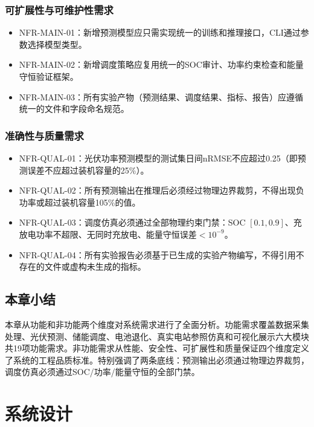 \documentclass[12pt,a4paper]{ctexbook}
\begin{document}
\subsection{可扩展性与可维护性需求}

\begin{itemize}
  \item NFR-MAIN-01：新增预测模型应只需实现统一的训练和推理接口，CLI通过参数选择模型类型。
  \item NFR-MAIN-02：新增调度策略应复用统一的SOC审计、功率约束检查和能量守恒验证框架。
  \item NFR-MAIN-03：所有实验产物（预测结果、调度结果、指标、报告）应遵循统一的文件和字段命名规范。
\end{itemize}

\subsection{准确性与质量需求}

\begin{itemize}
  \item NFR-QUAL-01：光伏功率预测模型的测试集日间nRMSE不应超过0.25（即预测误差不应超过装机容量的25\%）。
  \item NFR-QUAL-02：所有预测输出在推理后必须经过物理边界裁剪，不得出现负功率或超过装机容量105\%的值。
  \item NFR-QUAL-03：调度仿真必须通过全部物理约束门禁：SOC $[0.1, 0.9]$、充放电功率不超限、无同时充放电、能量守恒误差$< 10^{-9}$。
  \item NFR-QUAL-04：所有实验报告必须基于已生成的实验产物编写，不得引用不存在的文件或虚构未生成的指标。
\end{itemize}

\section{本章小结}

本章从功能和非功能两个维度对系统需求进行了全面分析。功能需求覆盖数据采集处理、光伏预测、储能调度、电池退化、真实电站参照仿真和可视化展示六大模块共19项功能需求。非功能需求从性能、安全性、可扩展性和质量保证四个维度定义了系统的工程品质标准。特别强调了两条底线：预测输出必须通过物理边界裁剪，调度仿真必须通过SOC/功率/能量守恒的全部门禁。

\chapter{系统设计}
\end{document}

